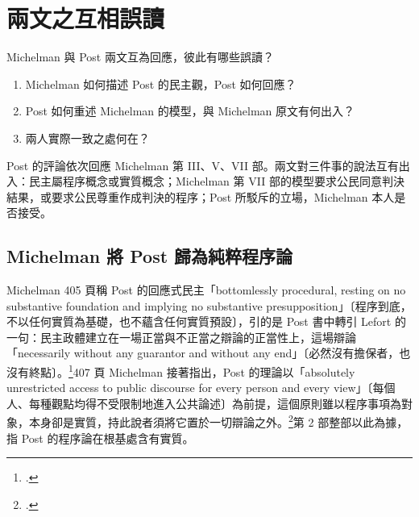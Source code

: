 \chapter{兩文之互相誤讀}
\label{ch:70_misreadings}

\begin{qaquestion}
Michelman 與 Post 兩文互為回應，彼此有哪些誤讀？
\begin{enumerate}
\tightlist
\item Michelman 如何描述 Post 的民主觀，Post 如何回應？
\item Post 如何重述 Michelman 的模型，與 Michelman 原文有何出入？
\item 兩人實際一致之處何在？
\end{enumerate}
\end{qaquestion}

Post 的評論依次回應 Michelman 第 III、V、VII 部。兩文對三件事的說法互有出入：民主屬程序概念或實質概念；Michelman 第 VII 部的模型要求公民同意判決結果，或要求公民尊重作成判決的程序；Post 所駁斥的立場，Michelman 本人是否接受。

\section{Michelman 將 Post 歸為純粹程序論}
\label{sec:70_misreadings-1}

Michelman 405 頁稱 Post 的回應式民主「bottomlessly procedural, resting on no substantive foundation and implying no substantive presupposition」〔程序到底，不以任何實質為基礎，也不蘊含任何實質預設〕，引的是 Post 書中轉引 Lefort 的一句：民主政體建立在一場正當與不正當之辯論的正當性上，這場辯論「necessarily without any guarantor and without any end」〔必然沒有擔保者，也沒有終點〕。\footcite[405 \& n.18]{michelman1998}407 頁 Michelman 接著指出，Post 的理論以「absolutely unrestricted access to public discourse for every person and every view」〔每個人、每種觀點均得不受限制地進入公共論述〕為前提，這個原則雖以程序事項為對象，本身卻是實質，持此說者須將它置於一切辯論之外。\footcite[407]{michelman1998}第 2 部整部以此為據，指 Post 的程序論在根基處含有實質。

